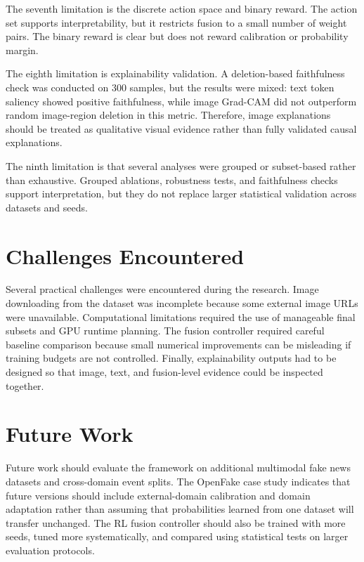 The seventh limitation is the discrete action space and binary reward. The action set supports interpretability, but it restricts fusion to a small number of weight pairs. The binary reward is clear but does not reward calibration or probability margin.


The eighth limitation is explainability validation. A deletion-based faithfulness check was conducted on 300 samples, but the results were mixed: text token saliency showed positive faithfulness, while image Grad-CAM did not outperform random image-region deletion in this metric. Therefore, image explanations should be treated as qualitative visual evidence rather than fully validated causal explanations.


The ninth limitation is that several analyses were grouped or subset-based rather than exhaustive. Grouped ablations, robustness tests, and faithfulness checks support interpretation, but they do not replace larger statistical validation across datasets and seeds.


\section{Challenges Encountered}


Several practical challenges were encountered during the research. Image downloading from the dataset was incomplete because some external image URLs were unavailable. Computational limitations required the use of manageable final subsets and GPU runtime planning. The fusion controller required careful baseline comparison because small numerical improvements can be misleading if training budgets are not controlled. Finally, explainability outputs had to be designed so that image, text, and fusion-level evidence could be inspected together.


\section{Future Work}


Future work should evaluate the framework on additional multimodal fake news datasets and cross-domain event splits. The OpenFake case study indicates that future versions should include external-domain calibration and domain adaptation rather than assuming that probabilities learned from one dataset will transfer unchanged. The RL fusion controller should also be trained with more seeds, tuned more systematically, and compared using statistical tests on larger evaluation protocols.


